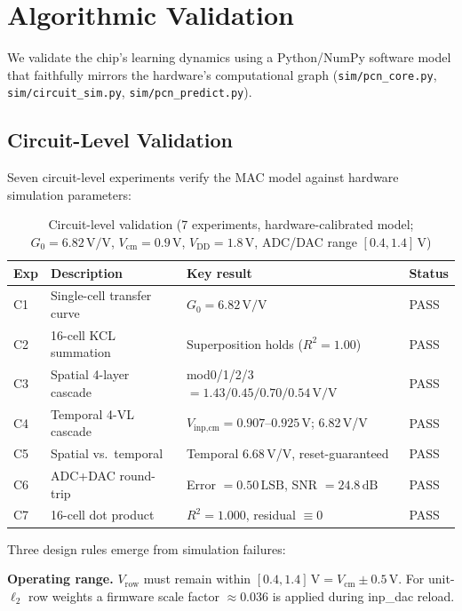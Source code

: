 \documentclass[journal,10pt,twoside]{IEEEtran}
\begin{document}
\section{Algorithmic Validation}
\label{sec:results}

We validate the chip's learning dynamics using a Python/NumPy software model
that faithfully mirrors the hardware's computational graph
(\texttt{sim/pcn\_core.py}, \texttt{sim/circuit\_sim.py},
\texttt{sim/pcn\_predict.py}).

\subsection{Circuit-Level Validation}
\label{sec:circuit}

Seven circuit-level experiments verify the MAC model against hardware
simulation parameters:

\begin{table}[t]
\caption{Circuit-level validation (7 experiments, hardware-calibrated model;
$G_0 = 6.82\,\text{V/V}$, $V_\text{cm}=0.9\,\text{V}$,
$V_\text{DD}=1.8\,\text{V}$, ADC/DAC range $[0.4, 1.4]\,\text{V}$)}
\label{tab:circuit}
\centering
\footnotesize
\begin{tabular}{lP{2.2cm}P{3.5cm}l}
\toprule
Exp & Description & Key result & Status \\
\midrule
C1 & Single-cell transfer curve & $G_0 = 6.82\,\text{V/V}$ & PASS \\
C2 & 16-cell KCL summation & Superposition holds ($R^2=1.00$) & PASS \\
C3 & Spatial 4-layer cascade & mod0/1/2/3 $= 1.43/0.45/0.70/0.54\,\text{V/V}$ & PASS \\
C4 & Temporal 4-VL cascade & $V_\text{inp,cm} = 0.907$--$0.925\,\text{V}$; 6.82\,V/V & PASS \\
C5 & Spatial vs.\ temporal & Temporal 6.68\,V/V, reset-guaranteed & PASS \\
C6 & ADC+DAC round-trip & Error $= 0.50\,\text{LSB}$, SNR $= 24.8\,\text{dB}$ & PASS \\
C7 & 16-cell dot product & $R^2 = 1.000$, residual $\equiv 0$ & PASS \\
\bottomrule
\end{tabular}
\end{table}

Three design rules emerge from simulation failures:

\textbf{Operating range.}
$V_\text{row}$ must remain within $[0.4, 1.4]\,\text{V} = V_\text{cm} \pm 0.5\,\text{V}$.
For unit-$\ell_2$ row weights a firmware scale factor $\approx 0.036$
is applied during inp\_dac reload.
\end{document}
